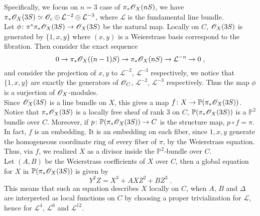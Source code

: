 Specifically, we focus on $n=3$ case of $\pi_*\mathscr{O}_X(nS)$, we have $\pi_*\mathscr{O}_X(3S)\simeq \mathscr{O}_c\oplus \mathcal{L}^{-2}\oplus \mathcal{L}^{-3}$, where $\mathcal{L}$ is the fundamental line bundle.\\ \indent
Let $\phi\colon \pi^*\pi_*\mathscr{O}_X(3S)\rightarrow \mathscr{O}_X(3S)$ be the natural map. Locally on $C$, $\mathscr{O}_X(3S)$ is generated by $\{1,x,y\}$ where $(x,y)$ is a Weierstrass basis correspond to the fibration. Then consider the exact sequence
\[ 0\rightarrow \pi_*\mathscr{O}_X((n-1)S)\rightarrow \pi_*\mathscr{O}_X(nS)\rightarrow \mathcal{L}^{-n}\rightarrow 0\; , \]
and consider the projection of $x,y$ to $\mathcal{L}^{-2}$, $\mathcal{L}^{-3}$ respectively, we notice that $\{1,x,y\}$ are exactly the generators of $\mathscr{O}_C$, $\mathcal{L}^{-2}$, $\mathcal{L}^{-3}$ respectively. Thus the map $\phi$ is a surjection of $\mathscr{O}_X$-modules.\\ \indent
Since $\mathscr{O}_X(3S)$ is a line bundle on $X$, this gives a map $f\colon X\rightarrow \mathbb{P}(\pi_*\mathscr{O}_X(3S))$. Notice that $\pi_*\mathscr{O}_X(3S)$ is a locally free sheaf of rank 3 on $C$, $\mathbb{P}(\pi_*\mathscr{O}_X(3S))$ is a $\mathbb{P}^2$ bundle over $C$. Moreover, if $p\colon\mathbb{P}(\pi_*\mathscr{O}_X(3S))\rightarrow C$ is the structure map, $p\circ f=\pi$.\\ \indent
In fact, $f$ is an embedding. It is an embedding on each fiber, since $1,x,y$ generate the homogeneous coordinate ring of every fiber of $\pi$, by the Weierstrass equation. Thus, via $f$, we realized $X$ as a divisor inside the $\mathbb{P}^2$-bundle over $C$.\\ \indent
Let $(A,B)$ be the Weierstrass coefficients of $X$ over $C$, then a global equation for $X$ in $\mathbb{P}(\pi_*\mathscr{O}_X(3S))$ is given by \[ Y^2Z=X^3+AXZ^2+BZ^3\; . \]
\indent This means that such an equation describes $X$ locally on $C$, when $A$, $B$ and $\Delta$ are interpreted as local functions on $C$ by choosing a proper trivialization for $\mathcal{L}$, hence for $\mathcal{L}^{4}$, $\mathcal{L}^6$ and $\mathcal{L}^{12}$. 


